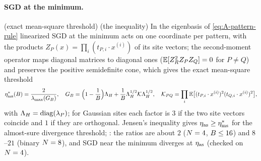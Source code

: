 \paragraph{SGD at the minimum.} \derived{} (exact mean-square threshold) \proven{} (the inequality)
In the eigenbasis of \eqref{eq:A-pattern-rule} linearized SGD at the minimum acts on one coordinate per
pattern, with the products $Z_P(x)=\prod_i(t_{P,i}\cdot x^{(i)})$ of its site vectors; the second-moment
operator maps diagonal matrices to diagonal ones ($\mathbb{E}[Z_R^2Z_PZ_Q]=0$ for $P\ne Q$) and preserves the
positive semidefinite cone, which gives the exact mean-square threshold
\begin{equation}\label{eq:A-ms-threshold}
  \eta^*_{\rm ms}(B)=\frac{2}{\lambda_{\max}(G_B)},\quad
  G_B=\Big(1-\frac1{B}\Big)\Lambda_H+\frac1{B}\Lambda_H^{1/2}\mathcal K\Lambda_H^{1/2},\quad
  \mathcal K_{PQ}=\prod_i\mathbb{E}\big[(t_{P,i}\cdot x^{(i)})^2(t_{Q,i}\cdot x^{(i)})^2\big],
\end{equation}
with $\Lambda_H=\operatorname{diag}(\lambda_P)$; for Gaussian sites each factor is $3$ if the two site vectors coincide and
$1$ if they are orthogonal. Jensen's inequality gives $\eta_{\rm as}\ge\eta^*_{\rm ms}$ for the almost-sure divergence threshold; \empirical: the
ratios are about $2$ ($N=4$, $B\le16$) and $8$--$21$ (binary $N=8$), and SGD near the minimum diverges at
$\eta_{\rm as}$ (checked on $N=4$).

